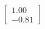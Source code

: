 \documentclass[preview]{standalone}
\begin{document}
\begin{align*}
\begin{bmatrix} 1.00 \\ -0.81 \end{bmatrix}
\end{align*}
\end{document}
